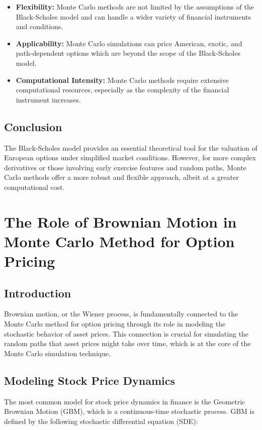 \documentclass{article}
\begin{document}
\begin{itemize}
    \item \textbf{Flexibility:} Monte Carlo methods are not limited by the assumptions of the Black-Scholes model and can handle a wider variety of financial instruments and conditions.
    \item \textbf{Applicability:} Monte Carlo simulations can price American, exotic, and path-dependent options which are beyond the scope of the Black-Scholes model.
    \item \textbf{Computational Intensity:} Monte Carlo methods require extensive computational resources, especially as the complexity of the financial instrument increases.
\end{itemize}

\subsection*{Conclusion}
The Black-Scholes model provides an essential theoretical tool for the valuation of European options under simplified market conditions. However, for more complex derivatives or those involving early exercise features and random paths, Monte Carlo methods offer a more robust and flexible approach, albeit at a greater computational cost.

\newpage
\section{The Role of Brownian Motion in Monte Carlo Method for Option Pricing}

\subsection*{Introduction}
Brownian motion, or the Wiener process, is fundamentally connected to the Monte Carlo method for option pricing through its role in modeling the stochastic behavior of asset prices. This connection is crucial for simulating the random paths that asset prices might take over time, which is at the core of the Monte Carlo simulation technique.

\subsection{Modeling Stock Price Dynamics}
The most common model for stock price dynamics in finance is the Geometric Brownian Motion (GBM), which is a continuous-time stochastic process. GBM is defined by the following stochastic differential equation (SDE):
\end{document}
